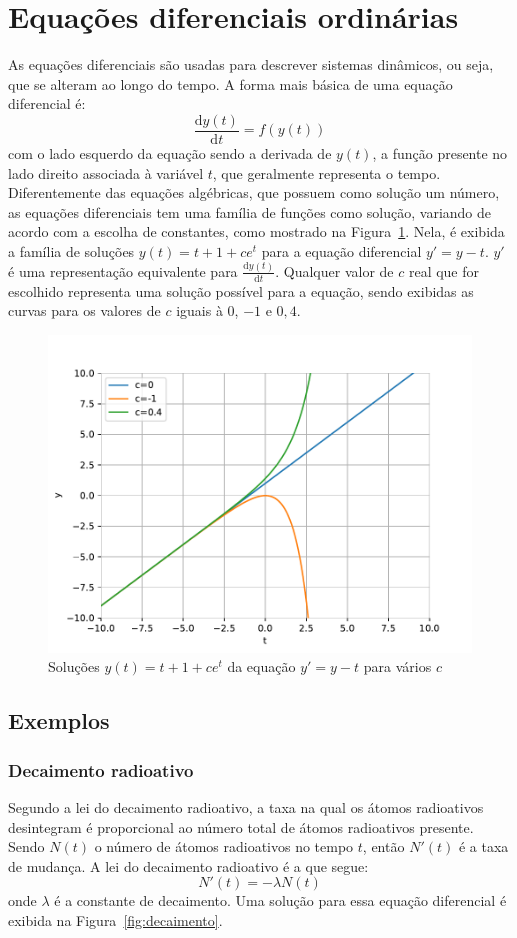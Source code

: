 \section{Equações diferenciais ordinárias}\label{sec:eqdif}
As equações diferenciais são usadas para descrever sistemas dinâmicos, ou seja, que se alteram ao longo do tempo. A forma mais básica de uma equação diferencial é:
\begin{equation}\label{eq:eq_diferencial}
	\frac{\mathrm{d}y(t)}{\mathrm{d}t}=f(y(t))
\end{equation}
com o lado esquerdo da equação sendo a derivada de $y(t)$, a função presente no lado direito associada à variável $t$, que geralmente representa o tempo. Diferentemente das equações algébricas, que possuem como solução um número, as equações diferenciais tem uma família de funções como solução, variando de acordo com a escolha de constantes, como mostrado na Figura~\ref{fig:solucao}. Nela, é exibida a família de soluções $y(t) = t + 1 + ce^t$ para a equação diferencial $y'=y-t$. $y'$ é uma representação equivalente para $\frac{\mathrm{d}y(t)}{\mathrm{d}t}$. Qualquer valor de $c$ real que for escolhido representa uma solução possível para a equação, sendo exibidas as curvas para os valores de $c$ iguais à $0$, $-1$ e $0,4$.

\begin{figure}[tb]
	\centering
	\caption{Soluções $y(t) = t + 1 + ce^t$ da equação $y'=y-t$ para vários $c$}
	\label{fig:solucao}
	\includegraphics[width=0.7\linewidth]{figs/solucao}
\end{figure}


\subsection{Exemplos}
\subsubsection{Decaimento radioativo}
Segundo a lei do decaimento radioativo, a taxa na qual os átomos radioativos desintegram é proporcional ao número total de átomos radioativos presente. Sendo $N(t)$ o número de átomos radioativos no tempo $t$, então $N'(t)$ é a taxa de mudança. A lei do decaimento radioativo é a que segue:
\begin{equation}\label{eq:decaimento_radioativo}
	N'(t) = -\lambda N(t)
\end{equation}
onde $\lambda$ é a constante de decaimento. Uma solução para essa equação diferencial é exibida na Figura~\ref{fig:decaimento}.

